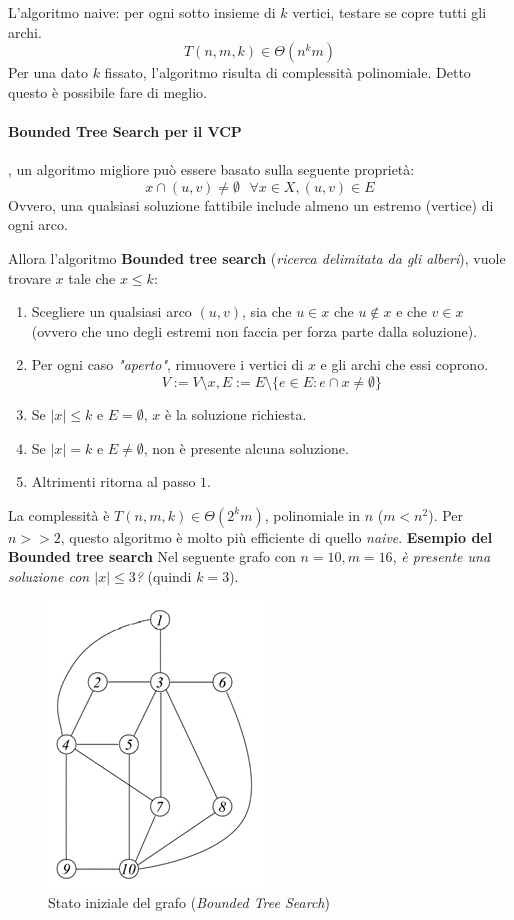 \documentclass{article}
\begin{document}
L'algoritmo naive: per ogni sotto insieme di $k$ vertici, testare se copre tutti gli archi.
$$T(n,m,k)\in\Theta(n^k m)$$
Per una dato $k$ fissato, l'algoritmo risulta di complessità polinomiale. Detto questo
è possibile fare di meglio.\paragraph{Bounded Tree Search per il VCP}, un algoritmo migliore può
essere basato sulla seguente proprietà:
$$x\cap(u,v)\neq\emptyset\text{ }\forall x\in X,(u,v)\in E$$
Ovvero, una qualsiasi soluzione fattibile include almeno un estremo (vertice)
di ogni arco.

Allora l'algoritmo \textbf{Bounded tree search} (\textit{ricerca delimitata da gli alberi}),
vuole trovare $x$ tale che $x\leq k$:
\begin{enumerate}
    \item Scegliere un qualsiasi arco $(u,v)$, sia che $u\in x$ che $u\notin x$ e
          che $v\in x$ (ovvero che uno degli estremi non faccia per forza parte dalla soluzione).
    \item Per ogni caso \textit{"aperto"}, rimuovere i vertici di $x$ e gli archi che
          essi coprono. $$V:=V\setminus x, E:=E\setminus\{e\in E:e\cap x\neq\emptyset\}$$
    \item Se $|x|\leq k$ e $E=\emptyset$, $x$ è la soluzione richiesta.
    \item Se $|x|=k$ e $E\neq\emptyset$, non è presente alcuna soluzione.
    \item Altrimenti ritorna al passo $1$.
\end{enumerate}
La complessità è $T(n,m,k)\in\Theta(2^km)$, polinomiale in $n$ ($m<n^2$). Per $n>>2$,
questo algoritmo è molto più efficiente di quello \textit{naive}.\newline
\noindent\textbf{Esempio del Bounded tree search}
\newline
Nel seguente grafo con $n=10,m=16$, \textit{è presente una soluzione con $|x|\leq 3$?} (quindi
$k=3$).
\begin{figure}[H]
    \centering
    \includegraphics[scale=1]{images/bounded_tree_search_1.png}
    \caption{Stato iniziale del grafo (\textit{Bounded Tree Search})}
\end{figure}
\end{document}
